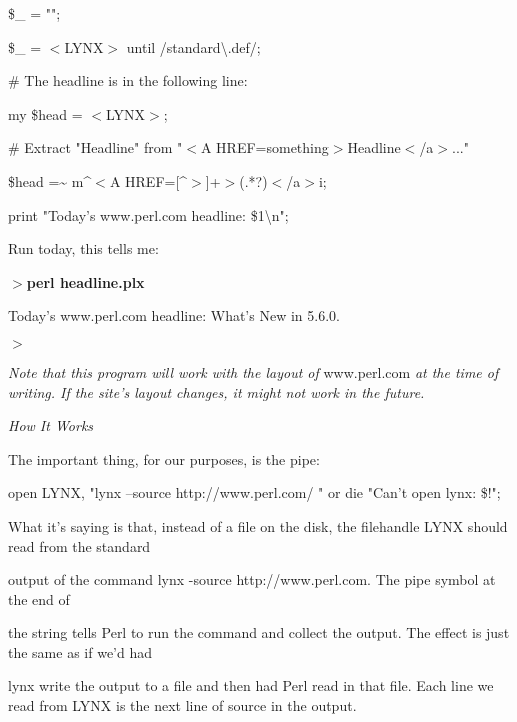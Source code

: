 \documentclass[a4paper,11pt]{book}
\begin{document}
\noindent \$\_  = "";

\noindent \$\_  = $<$LYNX$>$ until /standard\textbackslash .def/;

\noindent 

\noindent \# The headline is in the following line:

\noindent my \$head = $<$LYNX$>$;

\noindent 

\noindent \# Extract "Headline" from "$<$A HREF=something$>$Headline$<$/a$>$..."

\noindent \$head =\~{} m\textbar \^{}$<$A HREF=[\^{}$>$]+$>$(.*?)$<$/a$>$\textbar i;

\noindent 

\noindent print "Today's www.perl.com headline: \$1\textbackslash n";

\noindent 

\noindent Run today, this tells me:

\noindent 

\noindent $>$\textbf{perl headline.plx}

\noindent Today's www.perl.com headline: What's New in 5.6.0.

\noindent $>$

\noindent \textit{Note that this program will work with the layout of }www.perl.com\textit{ at the time of writing. If the site's layout changes, it might not work in the future.}

\noindent 

\noindent \textit{How It Works}

\noindent The important thing, for our purposes, is the pipe:

\noindent 

\noindent 

\noindent open LYNX, "lynx --source http://www.perl.com/ \textbar " or die "Can't open lynx: \$!";

\noindent 

\noindent 

\noindent What it's saying is that, instead of a file on the disk, the filehandle LYNX should read from the standard

\noindent output of the command lynx -source http://www.perl.com. The pipe symbol \textbar  at the end of

\noindent the string tells Perl to run the command and collect the output. The effect is just the same as if we'd had

\noindent lynx write the output to a file and then had Perl read in that file. Each line we read from LYNX is the next line of source in the output.
\end{document}
